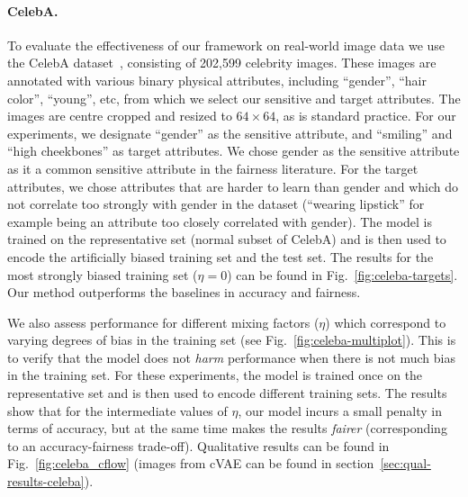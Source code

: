 \paragraph{CelebA.}
To evaluate the effectiveness of our framework on real-world image data we use the CelebA dataset~\citep{liu2015faceattributes}, consisting of 202,599 celebrity images.
These images are annotated with various binary physical  attributes, including ``gender'', ``hair color'', ``young'', etc, from which we  select our sensitive and target attributes.
The images are centre cropped and resized to $64\times64$, as is standard practice.
For our experiments, we designate ``gender'' as the sensitive attribute,
and ``smiling'' and ``high cheekbones'' as target attributes.
We chose gender as the sensitive attribute as it a common sensitive attribute in the fairness literature.
For the target attributes, we chose attributes that are harder to learn than gender and which do not correlate too strongly with gender in the dataset
(``wearing lipstick'' for example being an attribute too closely correlated with gender).
The model is trained on the representative set (normal subset of CelebA)
and is then used to encode the artificially biased training set and the test set.
The results for the most strongly biased training set ($\eta=0$) can be found in Fig.~\ref{fig:celeba-targets}.
Our method outperforms the baselines in accuracy and fairness.

We also assess performance for different mixing factors ($\eta$) which correspond to varying degrees of bias in the training set
(see Fig.~\ref{fig:celeba-multiplot}).
This is to verify that the model does not \emph{harm} performance when there is not much bias in the training set.
For these experiments, the model is trained once on the representative set and is then used to encode different training sets.
The results show that for the intermediate values of $\eta$, our model incurs a small penalty in terms of accuracy,
but at the same time makes the results \emph{fairer} (corresponding to an accuracy-fairness trade-off). Qualitative results can be found in Fig.~\ref{fig:celeba_cflow} (images from cVAE can be found in section~\ref{sec:qual-results-celeba}).

